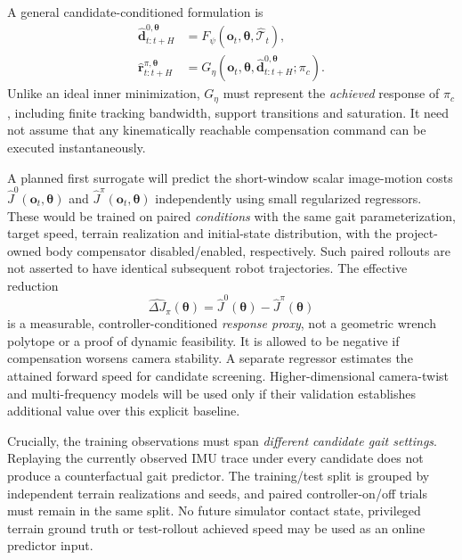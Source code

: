 A general candidate-conditioned formulation is
\begin{align}
\widehat{\bm d}^{0,\bm\theta}_{t:t+H}&=F_\psi(\bm o_t,\bm\theta,\widehat{\mathcal T}_t),\label{eq:predictor}\\
\widehat{\bm r}^{\pi,\bm\theta}_{t:t+H}&=G_\eta(\bm o_t,\bm\theta,\widehat{\bm d}^{0,\bm\theta}_{t:t+H};\pi_c).\label{eq:empiricalresponse}
\end{align}
Unlike an ideal inner minimization, $G_\eta$ must represent the \emph{achieved} response of $\pi_c$, including finite tracking bandwidth, support transitions and saturation. It need not assume that any kinematically reachable compensation command can be executed instantaneously.

A planned first surrogate will predict the short-window scalar image-motion costs $\widehat J^0(\bm o_t,\bm\theta)$ and $\widehat J^\pi(\bm o_t,\bm\theta)$ independently using small regularized regressors. These would be trained on paired \emph{conditions} with the same gait parameterization, target speed, terrain realization and initial-state distribution, with the project-owned body compensator disabled/enabled, respectively. Such paired rollouts are not asserted to have identical subsequent robot trajectories. The effective reduction
\begin{equation}\label{eq:authorityproxy}
\widehat{\Delta J}_{\pi}(\bm\theta)=\widehat J^0(\bm\theta)-\widehat J^\pi(\bm\theta)
\end{equation}
is a measurable, controller-conditioned \emph{response proxy}, not a geometric wrench polytope or a proof of dynamic feasibility. It is allowed to be negative if compensation worsens camera stability. A separate regressor estimates the attained forward speed for candidate screening. Higher-dimensional camera-twist and multi-frequency models will be used only if their validation establishes additional value over this explicit baseline.

Crucially, the training observations must span \emph{different candidate gait settings}. Replaying the currently observed IMU trace under every candidate does not produce a counterfactual gait predictor. The training/test split is grouped by independent terrain realizations and seeds, and paired controller-on/off trials must remain in the same split. No future simulator contact state, privileged terrain ground truth or test-rollout achieved speed may be used as an online predictor input.

